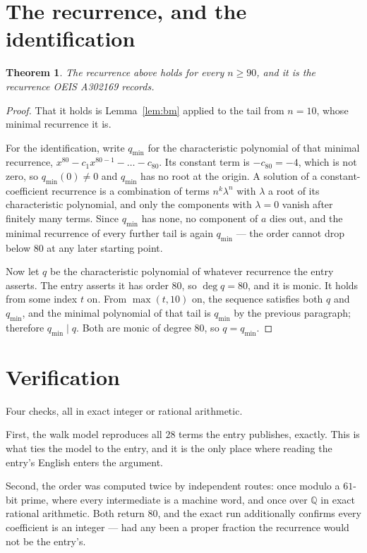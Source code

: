 \documentclass[11pt,a4paper]{article}
\theoremstyle{plain}
\newtheorem{theorem}{Theorem}
\theoremstyle{definition}
\begin{document}
\section{The recurrence, and the identification}

\begin{theorem}
The recurrence above holds for every $n\ge90$, and it is the recurrence OEIS A302169 records.
\end{theorem}

\begin{proof}
That it holds is Lemma~\ref{lem:bm} applied to the tail from $n=10$, whose minimal
recurrence it is.

For the identification, write $q_{\min}$ for the characteristic polynomial of that minimal
recurrence, $x^{80}-c_1x^{80-1}-\dots-c_{80}$. Its constant term is
$-c_{80}=-4$, which is not zero, so $q_{\min}(0)\neq0$ and $q_{\min}$ has no
root at the origin. A solution of a constant-coefficient recurrence is a combination of terms
$n^{k}\lambda^{n}$ with $\lambda$ a root of its characteristic polynomial, and only the
components with $\lambda=0$ vanish after finitely many terms. Since $q_{\min}$ has none, no
component of $a$ dies out, and the minimal recurrence of every further tail is again
$q_{\min}$ --- the order cannot drop below $80$ at any later starting point.

Now let $q$ be the characteristic polynomial of whatever recurrence the entry asserts. The
entry asserts it has order $80$, so $\deg q=80$, and it is monic. It holds from some
index $t$ on. From $\max(t,10)$ on, the sequence satisfies both $q$ and $q_{\min}$, and
the minimal polynomial of that tail is $q_{\min}$ by the previous paragraph; therefore
$q_{\min}\mid q$. Both are monic of degree $80$, so $q=q_{\min}$.
\end{proof}

\section{Verification}

Four checks, all in exact integer or rational arithmetic.

First, the walk model reproduces all $28$ terms the entry publishes, exactly. This is
what ties the model to the entry, and it is the only place where reading the entry's English
enters the argument.

Second, the order was computed twice by independent routes: once modulo a $61$-bit prime, where
every intermediate is a machine word, and once over $\mathbb{Q}$ in exact rational arithmetic.
Both return $80$, and the exact run additionally confirms every coefficient is an integer
--- had any been a proper fraction the recurrence would not be the entry's.
\end{document}

